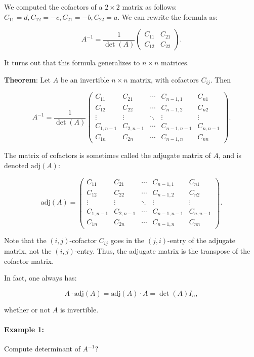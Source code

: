 \documentclass[a4paper,12pt]{article}
\begin{document}
We computed the cofactors of a \( 2 \times 2 \) matrix as follows: \( C_{11} = d, C_{12} = -c, C_{21} = -b, C_{22} = a \). We can rewrite the formula as:

\[
A^{-1} = \frac{1}{\det(A)} \begin{pmatrix} C_{11} & C_{21} \\ C_{12} & C_{22} \end{pmatrix}.
\]

It turns out that this formula generalizes to \( n \times n \) matrices.

\textbf{Theorem}: Let \( A \) be an invertible \( n \times n \) matrix, with cofactors \( C_{ij} \). Then

\[
A^{-1} = \frac{1}{\det(A)} \begin{pmatrix} 
C_{11} & C_{21} & \cdots & C_{n-1,1} & C_{n1} \\
C_{12} & C_{22} & \cdots & C_{n-1,2} & C_{n2} \\
\vdots & \vdots & \ddots & \vdots & \vdots \\
C_{1,n-1} & C_{2,n-1} & \cdots & C_{n-1,n-1} & C_{n,n-1} \\
C_{1n} & C_{2n} & \cdots & C_{n-1,n} & C_{nn}
\end{pmatrix}.
\]

The matrix of cofactors is sometimes called the adjugate matrix of \( A \), and is denoted \( \text{adj}(A) \):

\[
\text{adj}(A) = \begin{pmatrix} 
C_{11} & C_{21} & \cdots & C_{n-1,1} & C_{n1} \\
C_{12} & C_{22} & \cdots & C_{n-1,2} & C_{n2} \\
\vdots & \vdots & \ddots & \vdots & \vdots \\
C_{1,n-1} & C_{2,n-1} & \cdots & C_{n-1,n-1} & C_{n,n-1} \\
C_{1n} & C_{2n} & \cdots & C_{n-1,n} & C_{nn}
\end{pmatrix}.
\]

Note that the \( (i,j) \)-cofactor \( C_{ij} \) goes in the \( (j,i) \)-entry of the adjugate matrix, not the \( (i,j) \)-entry. Thus, the adjugate matrix is the transpose of the cofactor matrix.

In fact, one always has:

\[
A \cdot \text{adj}(A) = \text{adj}(A) \cdot A = \det(A) I_n,
\]

whether or not \( A \) is invertible.

\paragraph{Example 1:} Compute determinant of \( A^{-1} \)?
\end{document}

